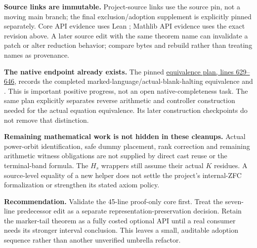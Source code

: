 \textbf{Source links are immutable.} Project-source links use the source pin, not a moving main branch; the final exclusion/adoption supplement is explicitly pinned separately. Core API evidence uses Lean ; Mathlib API evidence uses the exact revision above. A later source edit with the same theorem name can invalidate a patch or alter reduction behavior; compare bytes and rebuild rather than treating names as provenance.

\textbf{The native endpoint already exists.} The pinned \href{https://github.com/VladimirReshetnikov/ProveIt/blob/09d65a93c9df8684c1a226341d6a5120623d1cdb/Computability/DiophantineConsistency/LEAN_EQUIVALENCE_PLAN.md\#L629-L646}{equivalence plan, lines 629--646}, records the completed marked-language/actual-blank-halting equivalence and . This is important positive progress, not an open native-completeness task. The same plan explicitly separates reverse arithmetic and controller construction needed for the actual equation equivalence. Its later construction checkpoints do not remove that distinction.

\textbf{Remaining mathematical work is not hidden in these cleanups.} Actual power-orbit identification, safe dummy placement, rank correction and remaining arithmetic witness obligations are not supplied by direct cast reuse or the terminal-band formula. The \(H_s\) wrappers still assume their actual \(K\) residues. A source-level equality of a new helper does not settle the project's internal-ZFC formalization or strengthen its stated axiom policy.

\textbf{Recommendation.} Validate the 45-line proof-only core first. Treat the seven-line predecessor edit as a separate representation-preservation decision. Retain the marker-tail theorem as a fully costed optional API until a real consumer needs its stronger interval conclusion. This leaves a small, auditable adoption sequence rather than another unverified umbrella refactor.
